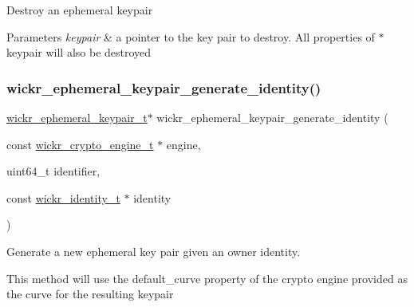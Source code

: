 Destroy an ephemeral keypair


\begin{DoxyParams}{Parameters}
{\em keypair} & a pointer to the key pair to destroy. All properties of \textquotesingle{}$\ast$keypair\textquotesingle{} will also be destroyed \\
\hline
\end{DoxyParams}
\mbox{\label{group__wickr__ephemeral__keypair_ga6c0935c579e3d4bdbfeada7cb60c2a1b}} 
\subsubsection{\texorpdfstring{wickr\+\_\+ephemeral\+\_\+keypair\+\_\+generate\+\_\+identity()}{wickr\_ephemeral\_keypair\_generate\_identity()}}
{\footnotesize\ttfamily \hyperlink{structwickr__ephemeral__keypair}{wickr\+\_\+ephemeral\+\_\+keypair\+\_\+t}$\ast$ wickr\+\_\+ephemeral\+\_\+keypair\+\_\+generate\+\_\+identity (\begin{DoxyParamCaption}\item[{const \hyperlink{structwickr__crypto__engine}{wickr\+\_\+crypto\+\_\+engine\+\_\+t} $\ast$}]{engine,  }\item[{uint64\+\_\+t}]{identifier,  }\item[{const \hyperlink{structwickr__identity}{wickr\+\_\+identity\+\_\+t} $\ast$}]{identity }\end{DoxyParamCaption})}

Generate a new ephemeral key pair given an owner identity.

This method will use the \textquotesingle{}default\+\_\+curve\textquotesingle{} property of the crypto engine provided as the curve for the resulting keypair


